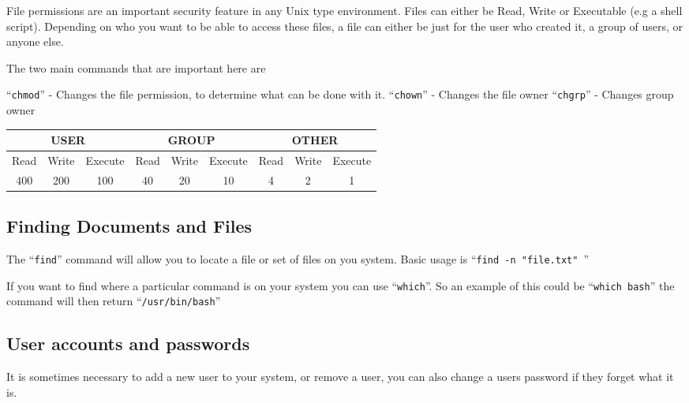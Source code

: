 \documentclass{extbook}
\begin{document}
File permissions are an important security feature in any Unix type environment. Files can either be Read, Write or Executable (e.g a shell script). Depending on who you want to be able to access these files,  a file can either be just for the user who created it, a group of users, or anyone else.

The two main commands that are important here are

``\verb|chmod|'' - Changes the file permission, to determine what can be done with it.
``\verb|chown|'' - Changes the file owner
``\verb|chgrp|'' - Changes group owner

\begin{table}[h]
\begin{tabular}{|ccc|ccc|ccc|}
\hline
\multicolumn{3}{|c|}{\textbf{USER}}                               & \multicolumn{3}{c|}{\textbf{GROUP}}                              & \multicolumn{3}{c|}{\textbf{OTHER}}                              \\ \hline
\multicolumn{1}{|c|}{Read} & \multicolumn{1}{c|}{Write} & Execute & \multicolumn{1}{c|}{Read} & \multicolumn{1}{c|}{Write} & Execute & \multicolumn{1}{c|}{Read} & \multicolumn{1}{c|}{Write} & Execute \\ \hline
\multicolumn{1}{|c|}{400}  & \multicolumn{1}{c|}{200}   & 100     & \multicolumn{1}{c|}{40}   & \multicolumn{1}{c|}{20}    & 10      & \multicolumn{1}{c|}{4}    & \multicolumn{1}{c|}{2}     & 1       \\ \hline
\end{tabular}
\end{table}


\subsection{Finding Documents and Files}

The ``\verb|find|'' command will allow you to locate a file or set of files on you system. Basic usage is ``\verb|find -n "file.txt" |''

If you want to find where a particular command is on your system you can use ``\verb|which|''. So an example of this could be ``\verb|which bash|'' the command will then return ``\verb|/usr/bin/bash|''

\subsection{User accounts and passwords}

It is sometimes necessary to add a new user to your system, or remove a user, you can also change a users password if they forget what it is.
\end{document}
